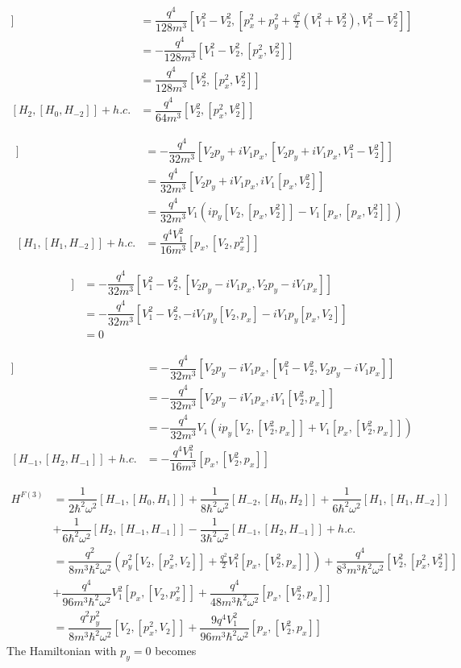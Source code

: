 \begin{align}
  [H_2,[H_0,H_{-2}]] &= \dfrac{q^4}{128m^3} [V_1^2 - V_2^2, [p_x^2 + p_y^2 + \tfrac{q^2}{2} (V_1^2 + V_2^2), V_1^2 - V_2^2]] \nonumber \\
  &= -\dfrac{q^4}{128m^3} [ V_1^2 - V_2^2, [p_x^2,V_2^2]] \nonumber \\
  &= \dfrac{q^4}{128m^3} [V_2^2,[p_x^2,V_2^2]] \nonumber \\
  [H_2,[H_0,H_{-2}]] + h.c. &= \dfrac{q^4}{64m^3} [V_2^2,[p_x^2,V_2^2]]
\end{align}

\begin{align}
  [H_1,[H_1, H_{-2}]] &= -\dfrac{q^4}{32m^3} [ V_2 p_y + i V_1 p_x, [V_2 p_y + i V_1 p_x, V_1^2 - V_2^2]] \nonumber \\
  &= \dfrac{q^4}{32m^3} [ V_2 p_y + i V_1 p_x, iV_1 [p_x,V_2^2]] \nonumber \\
  &= \dfrac{q^4}{32m^3} V_1 ( ip_y [V_2,[p_x,V_2^2]] - V_1 [p_x,[p_x,V_2^2]]) \nonumber \\
  [H_1,[H_1,H_{-2}]] + h.c. &= \dfrac{q^4 V_1^2}{16m^3} [p_x,[V_2,p_x^2]]
\end{align}

\begin{align}
  [H_2,[H_{-1},H_{-1}]] &= -\dfrac{q^4}{32m^3} [V_1^2 - V_2^2, [V_2 p_y - i V_1 p_x, V_2 p_y - i V_1 p_x]] \nonumber \\
  &= -\dfrac{q^4}{32m^3} [V_1^2 - V_2^2, -i V_1p_y [V_2,p_x] - i V_1p_y [p_x,V_2]] \nonumber \\
  &= 0
\end{align}

\begin{align}
  [H_{-1}, [H_2, H_{-1}]] &= -\dfrac{q^4}{32m^3} [V_2 p_y - i V_1 p_x, [V_1^2 - V_2^2, V_2 p_y - i V_1 p_x]] \nonumber \\
  &= -\dfrac{q^4}{32m^3} [V_2 p_y - i V_1 p_x, iV_1[V_2^2,p_x]] \nonumber \\
  &= -\dfrac{q^4}{32m^3} V_1( i p_y [V_2,[V_2^2,p_x]] + V_1[p_x,[V_2^2,p_x]]) \nonumber \\
  [H_{-1}, [H_2, H_{-1}]] + h.c. &= -\dfrac{q^4V_1^2}{16m^3} [p_x,[V_2^2,p_x]]
\end{align}

\begin{align}
  H^{F(3)} &= \dfrac{1}{2\hbar^2\omega^2} [H_{-1},[H_0,H_1]] + \dfrac{1}{8\hbar^2\omega^2} [H_{-2},[H_0,H_2]] + \dfrac{1}{6\hbar^2\omega^2} [H_1,[H_1,H_{-2}]] \nonumber \\
  &+ \dfrac{1}{6\hbar^2\omega^2} [H_2,[H_{-1},H_{-1}]] - \dfrac{1}{3\hbar^2\omega^2} [H_{-1},[H_2,H_{-1}]] + h.c. \\
  &= \dfrac{q^2}{8m^3\hbar^2\omega^2} \left( p_y^2 [V_2,[p_x^2,V_2]] + \tfrac{q^2}{2} V_1^2 [p_x,[V_2^2,p_x]]\right) + \dfrac{q^4}{8^3m^3\hbar^2\omega^2} [V_2^2,[p_x^2,V_2^2]] \nonumber \\
  &+ \dfrac{q^4}{96m^3\hbar^2\omega^2} V_1^2 [p_x,[V_2,p_x^2]] + \dfrac{q^4}{48m^3\hbar^2\omega^2} [p_x,[V_2^2,p_x]] \\
  &= \dfrac{q^2 p_y^2}{8m^3\hbar^2\omega^2} [V_2,[p_x^2,V_2]] + \dfrac{9q^4V_1^2}{96m^3\hbar^2\omega^2} [p_x,[V_2^2,p_x]]
\end{align}
The Hamiltonian with $p_y=0$ becomes

